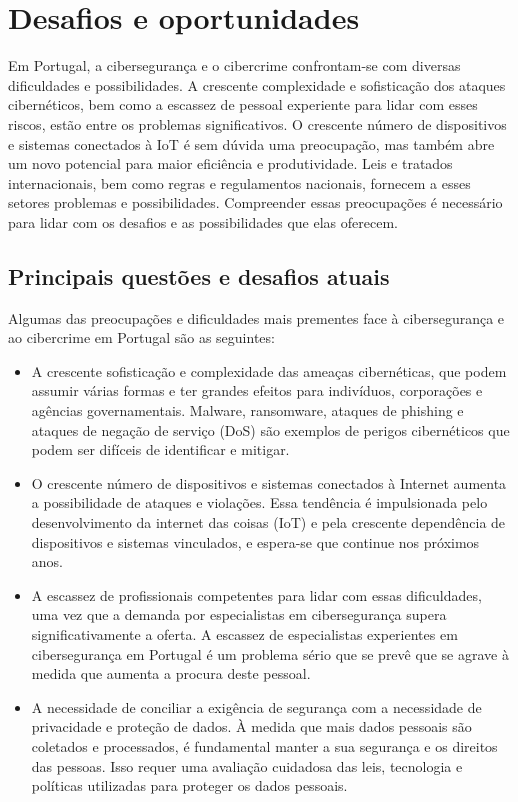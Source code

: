 \chapter{Desafios e oportunidades}

Em Portugal, a cibersegurança e o cibercrime confrontam-se com diversas dificuldades e possibilidades. A crescente complexidade e sofisticação dos ataques cibernéticos, bem como a escassez de pessoal experiente para lidar com esses riscos, estão entre os problemas significativos. O crescente número de dispositivos e sistemas conectados à IoT é sem dúvida uma preocupação, mas também abre um novo potencial para maior eficiência e produtividade. Leis e tratados internacionais, bem como regras e regulamentos nacionais, fornecem a esses setores problemas e possibilidades. Compreender essas preocupações é necessário para lidar com os desafios e as possibilidades que elas oferecem.

\section{Principais questões e desafios atuais}

Algumas das preocupações e dificuldades mais prementes face à cibersegurança e ao cibercrime em Portugal são as seguintes:

\begin{itemize}
  \item A crescente sofisticação e complexidade das ameaças cibernéticas, que podem assumir várias formas e ter grandes efeitos para indivíduos, corporações e agências governamentais. Malware, ransomware, ataques de phishing e ataques de negação de serviço (DoS) são exemplos de perigos cibernéticos que podem ser difíceis de identificar e mitigar.
  \item O crescente número de dispositivos e sistemas conectados à Internet aumenta a possibilidade de ataques e violações. Essa tendência é impulsionada pelo desenvolvimento da internet das coisas (IoT) e pela crescente dependência de dispositivos e sistemas vinculados, e espera-se que continue nos próximos anos.
  \item A escassez de profissionais competentes para lidar com essas dificuldades, uma vez que a demanda por especialistas em cibersegurança supera significativamente a oferta. A escassez de especialistas experientes em cibersegurança em Portugal é um problema sério que se prevê que se agrave à medida que aumenta a procura deste pessoal.
  \item A necessidade de conciliar a exigência de segurança com a necessidade de privacidade e proteção de dados. À medida que mais dados pessoais são coletados e processados, é fundamental manter a sua segurança e os direitos das pessoas. Isso requer uma avaliação cuidadosa das leis, tecnologia e políticas utilizadas para proteger os dados pessoais.
\end{itemize}

